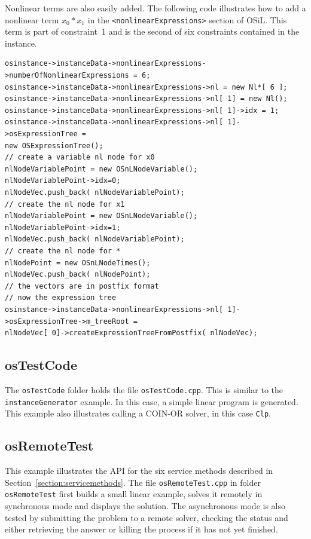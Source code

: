 \documentclass[11pt]{article}
\renewcommand{\_}{{\char"5F}}
\renewcommand{\{}{{\char"7B}}
\renewcommand{\}}{{\char"7D}}
\renewcommand{\^}{{\char"0D}}
\renewcommand{\'}{{\char"0D}}
\begin{document}
\begin{enumerate}[Step 1:]
Nonlinear terms are also easily added.  The following code illustrates how to add a nonlinear term 
$x_{0}*x_{1}$ in the {\tt <nonlinearExpressions>} section of  OSiL. This term is part of constraint~1
and is the second of six constraints contained in the instance.
\begin{verbatim}
osinstance->instanceData->nonlinearExpressions->numberOfNonlinearExpressions = 6;
osinstance->instanceData->nonlinearExpressions->nl = new Nl*[ 6 ];
osinstance->instanceData->nonlinearExpressions->nl[ 1] = new Nl();
osinstance->instanceData->nonlinearExpressions->nl[ 1]->idx = 1;
osinstance->instanceData->nonlinearExpressions->nl[ 1]->osExpressionTree =
new OSExpressionTree();
// create a variable nl node for x0
nlNodeVariablePoint = new OSnLNodeVariable();
nlNodeVariablePoint->idx=0;
nlNodeVec.push_back( nlNodeVariablePoint);
// create the nl node for x1
nlNodeVariablePoint = new OSnLNodeVariable();
nlNodeVariablePoint->idx=1;
nlNodeVec.push_back( nlNodeVariablePoint);
// create the nl node for *
nlNodePoint = new OSnLNodeTimes();
nlNodeVec.push_back( nlNodePoint);
// the vectors are in postfix format
// now the expression tree
osinstance->instanceData->nonlinearExpressions->nl[ 1]->osExpressionTree->m_treeRoot =
nlNodeVec[ 0]->createExpressionTreeFromPostfix( nlNodeVec);
\end{verbatim}


\subsection{osTestCode}\label{section:exampleOSTestCode}

The {\tt osTestCode} folder holds the file {\tt osTestCode.cpp}. This is similar to the {\tt instanceGenerator} example. 
In this case, a simple linear program is generated. This example also illustrates calling a COIN-OR solver, 
in this case {\tt Clp}.

\subsection{osRemoteTest}\label{section:exampleOSRemoteTest}

This example illustrates the API for the six service methods described in Section~\ref{section:servicemethods}.
The file {\tt osRemoteTest.cpp} in folder {\tt osRemoteTest} first builds a small linear
example, solves it remotely in synchronous mode and displays the solution. 
The asynchronous mode is also tested by submitting the problem to a remote solver, 
checking the status and either retrieving the answer or killing the process if it has not
yet finished.


\end{enumerate}
\end{document}
